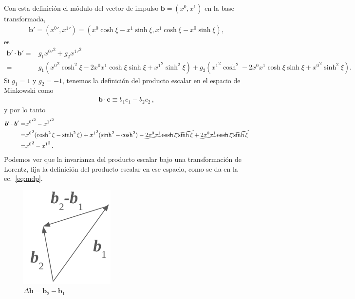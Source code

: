 \documentclass[11pt,a4paper]{article}
\begin{document}
Con esta definición el módulo del vector de impulso $\boldsymbol{b} = ({x^0},{x^1})$ en la base transformada, 
\begin{align*}
\boldsymbol{b}' = ({x^0}',{x^1}') = ({x^0}\cosh\xi - {x^1}\sinh\xi, {x^1}\cosh\xi -{x^0}\sinh\xi),
\end{align*}
es
\begin{align*}
    \boldsymbol{b}'\cdot\boldsymbol{b}' =& 
g_{1} {{x^0}'}^2 + g_{2} {{x^1}'}^2 \\
=& g_1\left({x^0}^2\cosh^2\xi -2 {x^0}{x^1}\cosh\xi\sinh\xi+{x^1}^2\sinh^2\xi\right)+
g_2\left({x^1}^2\cosh^2-2{x^0}{x^1}\cosh\xi\sinh\xi + {x^0}^2\sinh^2\xi\right).
\end{align*}
Si $g_1=1$ y $g_2=-1$, tenemos la definición del producto escalar en el espacio de Minkowski como
\begin{align}
\label{eq:mdp}
    \boldsymbol{b} \cdot \boldsymbol{c} \equiv b_1 c_1 - b_2 c_2\,,
\end{align}
y por lo tanto
\begin{align*}
    \boldsymbol{b}'\cdot\boldsymbol{b}' =& 
{{x^0}'}^2 - {{x^1}'}^2 \\
=& {x^0}^2(\cosh^2\xi-\sinh^2\xi)+{x^1}^2(\sinh^2-\cosh^2) -\cancel{2 {x^0}{x^1}\cosh\xi\sinh\xi}+\cancel{2 {x^0}{x^1}\cosh\xi\sinh\xi}\\
=&{x^0}^2 - {x^1}^2\,.
\end{align*}
Podemos ver que la invarianza del producto escalar bajo una transformación de Lorentz, fija la definición del producto escalar en ese espacio, como se da en la ec.~\eqref{eq:mdp}.

\begin{figure}
    \centering
    \includegraphics[scale=0.5]{b2-b1.png}
    \caption{$\Delta\boldsymbol{b} = \boldsymbol{b}_2 - \boldsymbol{b}_1$}
    \label{fig:b2-b1}
\end{figure}
\end{document}

